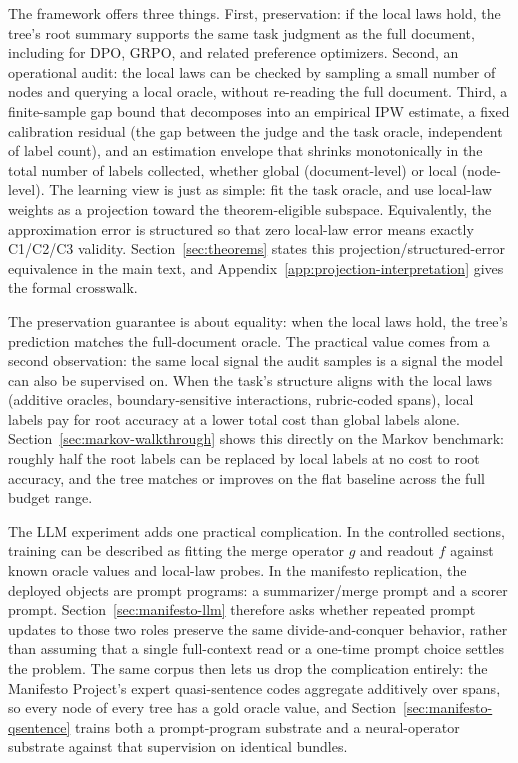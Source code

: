 The framework offers three things. First, preservation: if the local laws hold, the tree's root summary supports the same task judgment as the full document, including for DPO, GRPO, and related preference optimizers. Second, an operational audit: the local laws can be checked by sampling a small number of nodes and querying a local oracle, without re-reading the full document. Third, a finite-sample gap bound that decomposes into an empirical IPW estimate, a fixed calibration residual (the gap between the judge and the task oracle, independent of label count), and an estimation envelope that shrinks monotonically in the total number of labels collected, whether global (document-level) or local (node-level). The learning view is just as simple: fit the task oracle, and use local-law weights as a projection toward the theorem-eligible subspace. Equivalently, the approximation error is structured so that zero local-law error means exactly C1/C2/C3 validity. Section~\ref{sec:theorems} states this projection/structured-error equivalence in the main text, and Appendix~\ref{app:projection-interpretation} gives the formal crosswalk.

The preservation guarantee is about equality: when the local laws hold, the tree's prediction matches the full-document oracle. The practical value comes from a second observation: the same local signal the audit samples is a signal the model can also be supervised on. When the task's structure aligns with the local laws (additive oracles, boundary-sensitive interactions, rubric-coded spans), local labels pay for root accuracy at a lower total cost than global labels alone. Section~\ref{sec:markov-walkthrough} shows this directly on the Markov benchmark: roughly half the root labels can be replaced by local labels at no cost to root accuracy, and the tree matches or improves on the flat baseline across the full budget range.

The LLM experiment adds one practical complication. In the controlled
sections, training can be described as fitting the merge operator $g$ and
readout $f$ against known oracle values and local-law probes. In the
manifesto replication, the deployed objects are prompt programs: a
summarizer/merge prompt and a scorer prompt. Section~\ref{sec:manifesto-llm}
therefore asks whether repeated prompt updates to those two roles preserve
the same divide-and-conquer behavior, rather than assuming that a
single full-context read or a one-time prompt choice settles the problem.
The same corpus then lets us drop the complication entirely: the
Manifesto Project's expert quasi-sentence codes aggregate additively
over spans, so every node of every tree has a gold oracle value, and
Section~\ref{sec:manifesto-qsentence} trains both a prompt-program
substrate and a neural-operator substrate against that supervision on
identical bundles.

